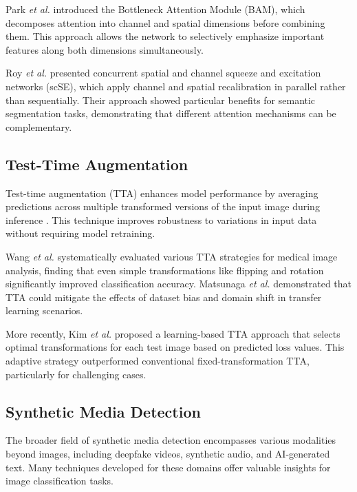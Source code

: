 \documentclass{article}
\begin{document}
Park \textit{et al.} \cite{park2018bam} introduced the Bottleneck Attention Module (BAM), which decomposes attention into channel and spatial dimensions before combining them. This approach allows the network to selectively emphasize important features along both dimensions simultaneously.

Roy \textit{et al.} \cite{roy2018concurrent} presented concurrent spatial and channel squeeze and excitation networks (scSE), which apply channel and spatial recalibration in parallel rather than sequentially. Their approach showed particular benefits for semantic segmentation tasks, demonstrating that different attention mechanisms can be complementary.

\subsection{Test-Time Augmentation}

Test-time augmentation (TTA) enhances model performance by averaging predictions across multiple transformed versions of the input image during inference \cite{krizhevsky2012imagenet}. This technique improves robustness to variations in input data without requiring model retraining.

Wang \textit{et al.} \cite{wang2018test} systematically evaluated various TTA strategies for medical image analysis, finding that even simple transformations like flipping and rotation significantly improved classification accuracy. Matsunaga \textit{et al.} \cite{matsunaga2017image} demonstrated that TTA could mitigate the effects of dataset bias and domain shift in transfer learning scenarios.

More recently, Kim \textit{et al.} \cite{kim2020learning} proposed a learning-based TTA approach that selects optimal transformations for each test image based on predicted loss values. This adaptive strategy outperformed conventional fixed-transformation TTA, particularly for challenging cases.

\subsection{Synthetic Media Detection}

The broader field of synthetic media detection encompasses various modalities beyond images, including deepfake videos, synthetic audio, and AI-generated text. Many techniques developed for these domains offer valuable insights for image classification tasks.
\end{document}
